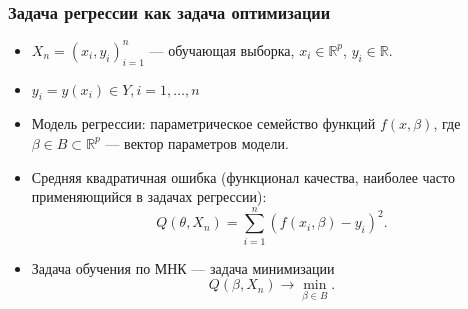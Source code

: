 \documentclass[ucs, notheorems, handout]{beamer}
\begin{document}
\begin{frame}
	\frametitle{Задача регрессии как задача оптимизации}
	
	\begin{itemize}
		\item $X_{n}=(x_{i},y_{i})_{i=1}^{n}$ --- обучающая выборка, $x_{i}\in\mathbb{R}^{p}$, $y_{i}\in\mathbb{R}$.
		\item $y_i = y(x_i) \in Y, i = 1, \dots, n$
		\item Модель регрессии: параметрическое семейство функций $f(x,\beta)$, где $\beta\in B \subset\mathbb{R}^{p}$ --- вектор параметров модели.
		\item Средняя квадратичная ошибка (функционал качества, наиболее часто применяющийся в задачах регрессии):
		\begin{equation*}
			Q(\theta,X_{n})=
			\sum_{i=1}^{n}
			(f(x_{i},\beta)-y_{i})^{2}.
		\end{equation*}
		\item Задача обучения по МНК --- задача минимизации
		\begin{equation*}
			Q(\beta,X_{n})
			\rightarrow
			\min_{\beta\in B}.
		\end{equation*}
	\end{itemize}
\end{frame}
\end{document}
